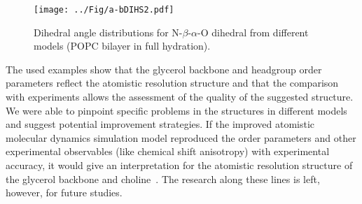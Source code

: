 \documentclass[journal=jacsat,manuscript=article]{achemso}
\begin{document}
\begin{figure}[]
  \centering
  \texttt{[image: ../Fig/a-bDIHS2.pdf]}
  \caption{\label{dihDISTS2}
    Dihedral angle distributions for N-$\beta$-$\alpha$-O dihedral from different models (POPC bilayer in full hydration).
  } 
\end{figure}

The used examples show that the glycerol backbone and headgroup order parameters reflect the atomistic resolution structure
and that the comparison with experiments allows the assessment of the quality of the suggested structure. We were able to pinpoint
specific problems in the structures in different models and suggest potential improvement strategies.
If the improved atomistic
molecular dynamics simulation model reproduced the order parameters and other experimental observables (like chemical shift anisotropy)
with experimental accuracy, it would give an interpretation for the atomistic resolution structure of the glycerol backbone and 
choline~\cite{seelig77b,skarjune79,jacobs80,davis83,akutsu91,hong95b,semchyschyn04}. The research along these lines is left, however,
for future studies.
\end{document}
